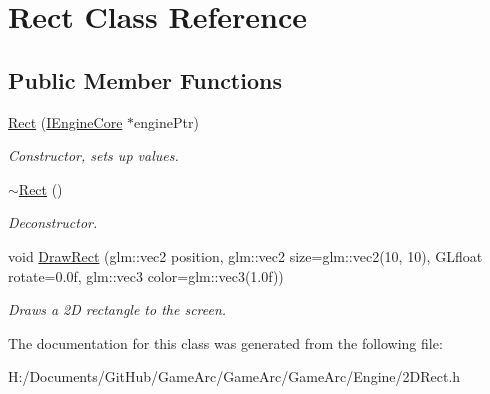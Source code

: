 \hypertarget{class_rect}{\section{Rect Class Reference}
\label{class_rect}
}
\subsection*{Public Member Functions}
\begin{DoxyCompactItemize}
\item 
\hypertarget{class_rect_a20beac407ba0c9319f43dedaa9a26395}{\hyperlink{class_rect_a20beac407ba0c9319f43dedaa9a26395}{Rect} (\hyperlink{class_i_engine_core}{I\+Engine\+Core} $\ast$engine\+Ptr)}\label{class_rect_a20beac407ba0c9319f43dedaa9a26395}

\begin{DoxyCompactList}\small\item\em Constructor, sets up values. \end{DoxyCompactList}\item 
\hypertarget{class_rect_af5c075b863024c3e39add95e07d10f39}{\hyperlink{class_rect_af5c075b863024c3e39add95e07d10f39}{$\sim$\+Rect} ()}\label{class_rect_af5c075b863024c3e39add95e07d10f39}

\begin{DoxyCompactList}\small\item\em Deconstructor. \end{DoxyCompactList}\item 
\hypertarget{class_rect_adb6ae995ea01a26b27f27ed23c6eab0b}{void \hyperlink{class_rect_adb6ae995ea01a26b27f27ed23c6eab0b}{Draw\+Rect} (glm\+::vec2 position, glm\+::vec2 size=glm\+::vec2(10, 10), G\+Lfloat rotate=0.\+0f, glm\+::vec3 color=glm\+::vec3(1.\+0f))}\label{class_rect_adb6ae995ea01a26b27f27ed23c6eab0b}

\begin{DoxyCompactList}\small\item\em Draws a 2\+D rectangle to the screen. \end{DoxyCompactList}\end{DoxyCompactItemize}


The documentation for this class was generated from the following file\+:\begin{DoxyCompactItemize}
\item 
H\+:/\+Documents/\+Git\+Hub/\+Game\+Arc/\+Game\+Arc/\+Game\+Arc/\+Engine/2\+D\+Rect.\+h\end{DoxyCompactItemize}

